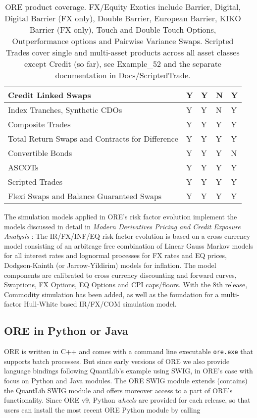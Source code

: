 \begin{table}[hbt]
\begin{center}
\begin{tabular}{|l|p{1.5cm}|p{1.5cm}|p{1.2cm}|p{1.5cm}|}
\hline
Credit Linked Swaps & Y & Y & N & Y \\
\hline
Index Tranches, Synthetic CDOs & Y & Y & N & Y \\
\hline
Composite Trades & Y & Y & Y & Y \\
\hline
Total Return Swaps and Contracts for Difference & Y & Y & Y & Y \\
\hline
Convertible Bonds & Y & Y & Y & N \\
\hline
ASCOTs & Y & Y & Y & Y \\
\hline
Scripted Trades & Y & Y & Y & Y \\
\hline
Flexi Swaps and Balance Guaranteed Swaps & Y & Y & Y & Y \\
\hline
\end{tabular}
\caption{ORE product coverage. FX/Equity Exotics include Barrier, Digital, Digital Barrier (FX only), Double Barrier, European Barrier, KIKO Barrier (FX only), Touch and Double Touch Options, Outperformance options and Pairwise Variance Swaps. Scripted Trades cover single and multi-asset products across all asset classes except Credit (so far), see Example\_52 and the separate documentation in Docs/ScriptedTrade.}
\label{tab_coverage}
\end{center}
\end{table}

\medskip The simulation models applied in ORE's risk factor evolution implement the models discussed in detail in {\em
  Modern Derivatives Pricing and Credit Exposure Analysis} \cite{Lichters}: The IR/FX/INF/EQ risk factor evolution is based on
a cross currency model consisting of an arbitrage free combination of Linear Gauss Markov models for all interest rates
and lognormal processes for FX rates and EQ prices, Dodgson-Kainth (or Jarrow-Yildirim) models for inflation. The model components are calibrated to cross currency discounting and forward curves, Swaptions, FX Options, EQ Options and CPI caps/floors. With the 8th release, Commodity simulation has been added, as well as the foundation for a multi-factor Hull-White based IR/FX/COM simulation model. 

\subsection{ORE in Python or Java}
\label{sec:intro_wheels}

ORE is written in C++ and comes with a command line executable {\tt ore.exe} that supports batch processes. 
But since early versions of ORE we also provide language bindings following QuantLib's example using SWIG, in ORE's case with focus on Python and Java modules. 
The ORE SWIG module extends (contains) the QuantLib SWIG module and offers moreover access to a part of ORE's functionality.
Since ORE v9, Python {\em wheels} are provided for each release, so that users can install the most recent ORE Python module by calling

